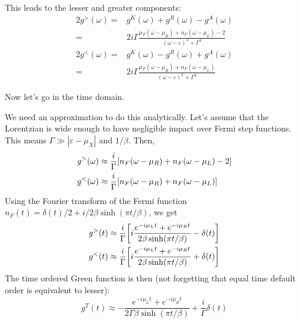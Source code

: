 \documentclass[12pt]{article}
\begin{document}
\begin{appendices}
This leads to the lesser and greater components:
\begin{align}
	2g^>(\omega) ={}& g^K(\omega) + g^R(\omega) - g^A(\omega)
	\\
	={}& 2i\Gamma \frac{n_F(\omega - \mu_R) + n_F(\omega - \mu_L) - 2}{(\omega - \varepsilon)^2 + \Gamma^2}
	\\
	2g^<(\omega) ={}& g^K(\omega) - g^R(\omega) + g^A(\omega)
	\\
	={}& 2i\Gamma \frac{n_F(\omega - \mu_R) + n_F(\omega - \mu_L)}{(\omega - \varepsilon)^2 + \Gamma^2}
\end{align}

Now let's go in the time domain.

We need an approximation to do this analytically. Let's assume that the Lorentzian is wide enough to have negligible impact over Fermi step functions. This means $\Gamma \gg |\varepsilon - \mu_X|$ and $1/\beta$. Then,
\begin{align}
	g^>(\omega) \approx{}& \frac{i}{\Gamma} \qty[n_F(\omega - \mu_R) + n_F(\omega - \mu_L) - 2]
	\\
	g^<(\omega) \approx{}& \frac{i}{\Gamma} \qty[n_F(\omega - \mu_R) + n_F(\omega - \mu_L)]
\end{align}
Using the Fourier transform of the Fermi function $n_F(t) = \delta(t)/2 + i/2\beta \sinh(\pi t / \beta)$, we get
\begin{align}
	g^>(t) \approx{}& \frac{i}{\Gamma} \qty[i\frac{e^{-i\mu_L t} + e^{-i\mu_R t}}{2\beta \sinh(\pi t / \beta)} - \delta(t)]
	\\
	g^<(t) \approx{}& \frac{i}{\Gamma} \qty[i\frac{e^{-i\mu_L t} + e^{-i\mu_R t}}{2\beta \sinh(\pi t / \beta)} + \delta(t)]
\end{align}
The time ordered Green function is then (not forgetting that equal time default order is equivalent to lesser):
\begin{equation}
	g^T(t) \approx - \frac{e^{-i\mu_L t} + e^{-i\mu_R t}}{2\Gamma\beta \sinh(\pi t / \beta)} + \frac{i}{\Gamma} \delta(t)
\end{equation}


\end{appendices}

%
%
\printbibliography
\end{document}

